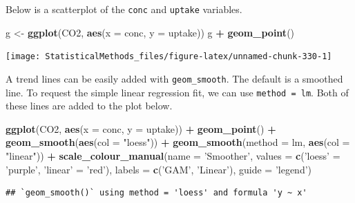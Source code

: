 \documentclass[
]{book}
\newenvironment{Shaded}{\begin{snugshade}}{\end{snugshade}}
\newcommand{\DataTypeTok}[1]{\textcolor[rgb]{0.13,0.29,0.53}{#1}}
\newcommand{\KeywordTok}[1]{\textcolor[rgb]{0.13,0.29,0.53}{\textbf{#1}}}
\newcommand{\NormalTok}[1]{#1}
\newcommand{\OperatorTok}[1]{\textcolor[rgb]{0.81,0.36,0.00}{\textbf{#1}}}
\newcommand{\StringTok}[1]{\textcolor[rgb]{0.31,0.60,0.02}{#1}}
\theoremstyle{definition}
\theoremstyle{definition}
\theoremstyle{definition}
\theoremstyle{remark}
\begin{document}
Below is a scatterplot of the \texttt{conc} and \texttt{uptake} variables.

\begin{Shaded}
\begin{Highlighting}[]
\NormalTok{g <-}\StringTok{ }\KeywordTok{ggplot}\NormalTok{(CO2, }\KeywordTok{aes}\NormalTok{(}\DataTypeTok{x =}\NormalTok{ conc, }\DataTypeTok{y =}\NormalTok{ uptake)) }
\NormalTok{g }\OperatorTok{+}\StringTok{ }\KeywordTok{geom_point}\NormalTok{()}
\end{Highlighting}
\end{Shaded}

\begin{center}\texttt{[image: StatisticalMethods\_files/figure-latex/unnamed-chunk-330-1]} \end{center}

A trend lines can be easily added with \texttt{geom\_smooth}. The default is a smoothed line. To request the simple linear regression fit, we can use \texttt{method\ =\ lm}. Both of these lines are added to the plot below.

\begin{Shaded}
\begin{Highlighting}[]
\KeywordTok{ggplot}\NormalTok{(CO2, }\KeywordTok{aes}\NormalTok{(}\DataTypeTok{x =}\NormalTok{ conc, }\DataTypeTok{y =}\NormalTok{ uptake)) }\OperatorTok{+}\StringTok{ }\KeywordTok{geom_point}\NormalTok{() }\OperatorTok{+}\StringTok{  }
\StringTok{  }\KeywordTok{geom_smooth}\NormalTok{(}\KeywordTok{aes}\NormalTok{(}\DataTypeTok{col =} \StringTok{"loess"}\NormalTok{)) }\OperatorTok{+}
\StringTok{  }\KeywordTok{geom_smooth}\NormalTok{(}\DataTypeTok{method =}\NormalTok{ lm, }\KeywordTok{aes}\NormalTok{(}\DataTypeTok{col =} \StringTok{"linear"}\NormalTok{)) }\OperatorTok{+}\StringTok{ }
\StringTok{  }\KeywordTok{scale_colour_manual}\NormalTok{(}\DataTypeTok{name =} \StringTok{'Smoother'}\NormalTok{, }\DataTypeTok{values =} \KeywordTok{c}\NormalTok{(}\StringTok{'loess'}\NormalTok{ =}\StringTok{ 'purple'}\NormalTok{, }\StringTok{'linear'}\NormalTok{ =}\StringTok{ 'red'}\NormalTok{), }
                      \DataTypeTok{labels =} \KeywordTok{c}\NormalTok{(}\StringTok{'GAM'}\NormalTok{, }\StringTok{'Linear'}\NormalTok{), }\DataTypeTok{guide =} \StringTok{'legend'}\NormalTok{)}
\end{Highlighting}
\end{Shaded}

\begin{verbatim}
## `geom_smooth()` using method = 'loess' and formula 'y ~ x'
\end{verbatim}
\end{document}
